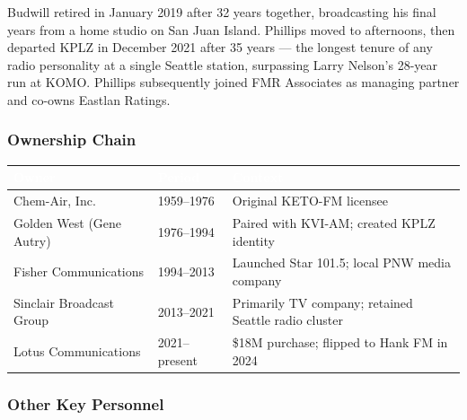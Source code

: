 \documentclass[11pt,letterpaper]{article}
\newcommand{\tableheader}[1]{\textbf{\sffamily\textcolor{white}{#1}}}
\begin{document}
Budwill retired in January 2019 after 32 years together, broadcasting his final years from a home studio on San Juan Island. Phillips moved to afternoons, then departed KPLZ in December 2021 after 35 years --- the longest tenure of any radio personality at a single Seattle station, surpassing Larry Nelson's 28-year run at KOMO. Phillips subsequently joined FMR Associates as managing partner and co-owns Eastlan Ratings.

\subsubsection{Ownership Chain}

\begin{center}
\begin{tabularx}{\textwidth}{L{3.5cm}C{2cm}X}
\toprule
{}
\tableheader{Owner} & \tableheader{Period} & \tableheader{Context} \\
\midrule
Chem-Air, Inc. & 1959--1976 & Original KETO-FM licensee \\
Golden West (Gene Autry) & 1976--1994 & Paired with KVI-AM; created KPLZ identity \\
Fisher Communications & 1994--2013 & Launched Star 101.5; local PNW media company \\
Sinclair Broadcast Group & 2013--2021 & Primarily TV company; retained Seattle radio cluster \\
Lotus Communications & 2021--present & \$18M purchase; flipped to Hank FM in 2024 \\
\bottomrule
\end{tabularx}
\end{center}

\subsubsection{Other Key Personnel}
\end{document}
